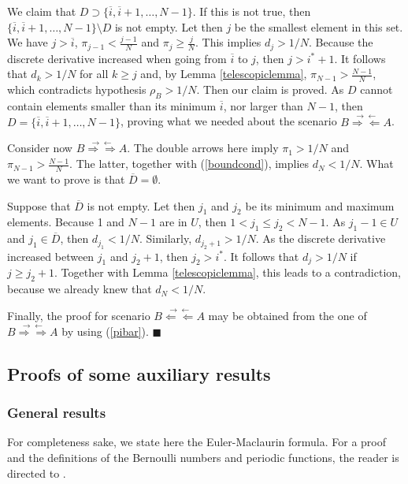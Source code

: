 \documentclass[12pt]{article}
\begin{document}
We claim that $D \supset \{\overline{i}, \overline{i}+1, \dots, N-1 \}$. If this is not true, then $\{\overline{i}, \overline{i}+1, \dots, N-1 \} \setminus D$ is not empty. Let then $j$ be the smallest element in this set. We have $j> \overline{i}$, $\pi_{j-1} < \frac{j-1}{N}$ and $\pi_j \geq \frac{j}{N}$. This implies $d_j>1/N$. Because the discrete derivative increased when going from $\overline{i}$ to $j$, then $j>i^{\ast}+1$. It follows that $d_k> 1/N$ for all $k \geq j$ and, by Lemma \ref{telescopiclemma}, $\pi_{N-1} > \frac{N-1}{N}$, which contradicts hypothesis $\rho_B>1/N$. Then our claim is proved. As $D$ cannot contain elements smaller than its minimum $\overline{i}$, nor larger than $N-1$, then $D = \{\overline{i}, \overline{i}+1, \dots, N-1 \}$, proving what we needed about the scenario $B\stackrel{\rightarrow \leftarrow}{\Rightarrow \Leftarrow} A$.

Consider now $B\stackrel{\rightarrow \leftarrow}{\Rightarrow \Rightarrow} A$. The double arrows here imply $\pi_1>1/N$ and $\pi_{N-1}>\frac{N-1}{N}$. The latter, together with (\ref{boundcond}), implies $d_N<1/N$. What we want to prove is that $\overline{D}=\emptyset$.

Suppose that $\overline{D}$ is not empty. Let then $j_1$ and $j_2$ be its minimum and maximum elements. Because 1 and $N-1$ are in $U$, then $1<j_1 \leq j_2<N-1$. As $j_1-1 \in U$ and $j_1 \in \overline{D}$, then $d_{j_1}<1/N$. Similarly, $d_{j_2+1}>1/N$. As the discrete derivative increased between $j_1$ and $j_2+1$, then $j_2> i^{\ast}$. It follows that $d_j>1/N$ if $j \geq j_2+1$. Together with Lemma \ref{telescopiclemma}, this leads to a contradiction, because we already knew that $d_N<1/N$.

Finally, the proof for scenario $B\stackrel{\rightarrow \leftarrow}{\Leftarrow \Leftarrow} A$ may be obtained from the one of $B\stackrel{\rightarrow \leftarrow}{\Rightarrow \Rightarrow} A$ by using (\ref{pibar}).
$\blacksquare$

\subsection{Proofs of some auxiliary results}\label{secintermediate}

\subsubsection{General results}\label{subsecgen}
For completeness sake, we state here the Euler-Maclaurin formula. For a proof and the definitions of the Bernoulli numbers and periodic functions, the reader is directed to \cite{apostol}.
\end{document}
